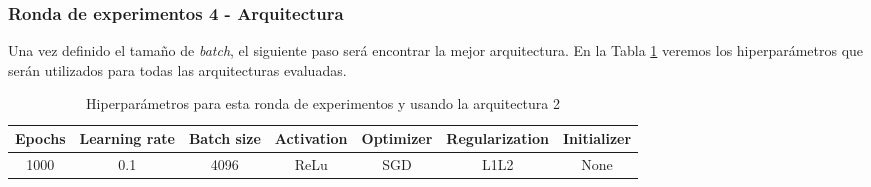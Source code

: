 \documentclass{article}
\begin{document}
      \subsubsection{Ronda de experimentos 4 - Arquitectura}
		\label{j-s-a0-e4} %
			Una vez definido el tama\~{n}o de \textit{batch}, el siguiente paso ser\'a encontrar la mejor arquitectura. En la Tabla \ref{tab:hip-j-a0-e4} veremos los hiperpar\'ametros que ser\'an utilizados para todas las arquitecturas evaluadas.
            
			\begin{table}[h!]
				\begin{center}
					\begin{tabular}{| c | c | c | c | c | c | c |}
						\textbf{Epochs} & \textbf{Learning rate} & \textbf{Batch size} & \textbf{Activation} & \textbf{Optimizer} & \textbf{Regularization} & \textbf{Initializer}\\ \hline
						1000 & 0.1 & 4096 & ReLu & SGD & L1L2 & None
					\end{tabular}
					\caption{Hiperpar\'ametros para esta ronda de experimentos y usando la arquitectura 2}
					\label{tab:hip-j-a0-e4}
				\end{center}
			\end{table}
			
\end{document}
